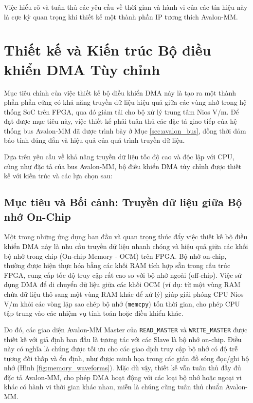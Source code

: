 Việc hiểu rõ và tuân thủ các yêu cầu về thời gian và hành vi của các tín hiệu này là cực kỳ quan trọng khi thiết kế một thành phần IP tương thích Avalon-MM.

\section{Thiết kế và Kiến trúc Bộ điều khiển DMA Tùy chỉnh}
\label{sec:dma_design_and_architecture}
Mục tiêu chính của việc thiết kế bộ điều khiển DMA này là tạo ra một thành phần phần cứng có khả năng truyền dữ liệu hiệu quả giữa các vùng nhớ trong hệ thống SoC trên FPGA, qua đó giảm tải cho bộ xử lý trung tâm Nios V/m. Để đạt được mục tiêu này, việc thiết kế phải tuân thủ các đặc tả giao tiếp của hệ thống bus Avalon-MM đã được trình bày ở Mục \ref{sec:avalon_bus}, đồng thời đảm bảo tính đúng đắn và hiệu quả của quá trình truyền dữ liệu.

Dựa trên yêu cầu về khả năng truyền dữ liệu tốc độ cao và độc lập với CPU, cũng như đặc tả của bus Avalon-MM, bộ điều khiển DMA tùy chỉnh được thiết kế với kiến trúc và các lựa chọn sau:

\subsection{Mục tiêu và Bối cảnh: Truyền dữ liệu giữa Bộ nhớ On-Chip}
\label{subsec:dma_context_onchip}
Một trong những ứng dụng ban đầu và quan trọng thúc đẩy việc thiết kế bộ điều khiển DMA này là nhu cầu truyền dữ liệu nhanh chóng và hiệu quả giữa các khối bộ nhớ trong chip (On-chip Memory - OCM) trên FPGA. Bộ nhớ on-chip, thường được hiện thực hóa bằng các khối RAM tích hợp sẵn trong cấu trúc FPGA, cung cấp tốc độ truy cập rất cao so với bộ nhớ ngoài (off-chip). Việc sử dụng DMA để di chuyển dữ liệu giữa các khối OCM (ví dụ: từ một vùng RAM chứa dữ liệu thô sang một vùng RAM khác để xử lý) giúp giải phóng CPU Nios V/m khỏi các vòng lặp sao chép bộ nhớ (\texttt{memcpy}) tốn thời gian, cho phép CPU tập trung vào các nhiệm vụ tính toán hoặc điều khiển khác.

Do đó, các giao diện Avalon-MM Master của \texttt{READ\_MASTER} và \texttt{WRITE\_MASTER} được thiết kế với giả định ban đầu là tương tác với các Slave là bộ nhớ on-chip. Điều này có nghĩa là chúng được tối ưu cho các giao dịch truy cập bộ nhớ có độ trễ tương đối thấp và ổn định, như được minh họa trong các giản đồ sóng đọc/ghi bộ nhớ (Hình \ref{fig:memory_waveforms}). Mặc dù vậy, thiết kế vẫn tuân thủ đầy đủ đặc tả Avalon-MM, cho phép DMA hoạt động với các loại bộ nhớ hoặc ngoại vi khác có hành vi thời gian khác nhau, miễn là chúng cũng tuân thủ chuẩn Avalon-MM.

